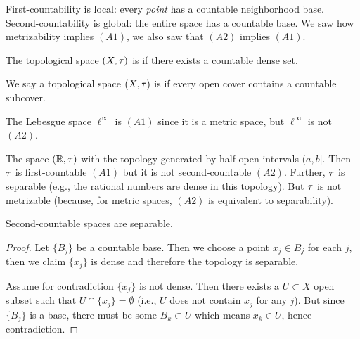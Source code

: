 
\lecture{}

\begin{node}
First-countability is local: every \emph{point} has a countable
neighborhood base. Second-countability is global: the entire space has
a countable base. We saw how metrizability implies $(A1)$, we also saw
that $(A2)$ implies $(A1)$.
\end{node}

\begin{definition}
The topological space $(X,\tau)$ is  if there
exists a countable dense set.
\end{definition}

\begin{definition}
We say a topological space $(X,\tau)$ is  if
every open cover contains a countable subcover.
\end{definition}

\begin{example}
The Lebesgue space $\ell^{\infty}$ is $(A1)$ since it is a metric
space, but $\ell^{\infty}$ is not $(A2)$.
\end{example}

\begin{example}
The space $(\mathbb{R},\tau)$ with the topology generated by half-open
intervals $(a,b]$. Then $\tau$ is first-countable $(A1)$ but it
is not second-countable $(A2)$. Further, $\tau$ is separable
(e.g., the rational numbers are dense in this topology). But
$\tau$ is not metrizable (because, for metric spaces, $(A2)$ is
equivalent to separability).
\end{example}

\begin{theorem}
Second-countable spaces are separable.
\end{theorem}

\begin{proof}
Let $\{B_{j}\}$ be a countable base. Then we choose a point $x_{j}\in B_{j}$
for each $j$, then we claim $\{x_{j}\}$ is dense and therefore the
topology is separable.

Assume for contradiction $\{x_{j}\}$ is not dense. Then there exists a
$U\subset X$ open subset such that $U\cap\{x_{j}\}=\emptyset$ (i.e.,
$U$ does not contain $x_{j}$ for any $j$). But since $\{B_{j}\}$ is a
base, there must be some $B_{k}\subset U$ which means $x_{k}\in U$,
hence contradiction.
\end{proof}

